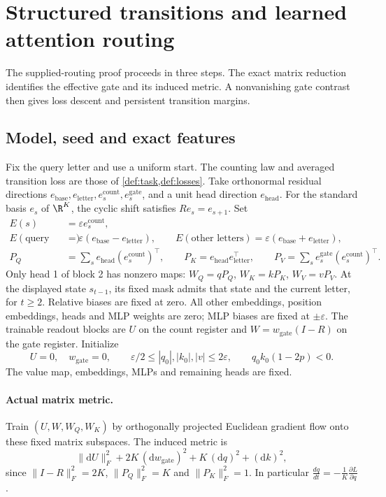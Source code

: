 \section{Structured transitions and learned attention routing}
\label{app:aligned-transformer}
The supplied-routing proof proceeds in three steps.
The exact matrix reduction identifies the effective gate and its induced metric.
A nonvanishing gate contrast then gives loss descent and persistent transition margins.


\subsection{Model, seed and exact features}
\label{app:aligned-seed}
Fix the query letter and use a uniform start. The counting law and averaged transition loss are those of \cref{def:task,def:losses}.
Take orthonormal residual directions $e_{\mathrm{base}},e_{\mathrm{letter}},e_s^{\mathrm{count}},
e_s^{\mathrm{gate}}$, and a unit head direction $e_{\mathrm{head}}$.
For the standard basis $e_s$ of $\R^K$, the cyclic shift satisfies $R e_s=e_{s+1}$. Set
\[
\begin{aligned}
 E(s)&=\varepsilon e_s^{\mathrm{count}},\\
 E(\text{query letter})&=\varepsilon(e_{\mathrm{base}}-e_{\mathrm{letter}}),\qquad
 E(\text{other letters})=\varepsilon(e_{\mathrm{base}}+e_{\mathrm{letter}}),\\
 P_Q&=\sum_s e_{\mathrm{head}}(e_s^{\mathrm{count}})^\top,\qquad
 P_K=e_{\mathrm{head}}e_{\mathrm{letter}}^\top,\qquad
 P_V=\sum_s e_s^{\mathrm{gate}}(e_s^{\mathrm{count}})^\top.
\end{aligned}
\]
Only head 1 of block 2 has nonzero maps:
$W_Q=qP_Q$, $W_K=kP_K$, $W_V=vP_V$. At the displayed state $s_{t-1}$,
its fixed mask admits that state and the current letter, for $t\ge2$.
Relative biases are fixed at zero.
All other embeddings, position embeddings, heads and MLP weights are zero;
MLP biases are fixed at $\pm\varepsilon$.
The trainable readout blocks are $U$ on the count register and
$W=w_{\mathrm{gate}}(I-R)$ on the gate register. Initialize
\[
 U=0,\quad w_{\mathrm{gate}}=0,\qquad
 \varepsilon/2\le |q_0|,|k_0|,|v|\le2\varepsilon,
 \qquad q_0k_0(1-2p)<0.
\]
The value map, embeddings, MLPs and remaining heads are fixed.

\paragraph{Actual matrix metric.}
Train $(U,W,W_Q,W_K)$ by orthogonally projected Euclidean gradient flow onto
these fixed matrix subspaces. The induced metric is
\begin{equation}
 \|\mathrm dU\|_F^2+2K\,(\mathrm dw_{\mathrm{gate}})^2+K\,(\mathrm dq)^2+(\mathrm dk)^2,
 \label{eq:aligned-metric}
\end{equation}
since $\|I-R\|_F^2=2K$, $\|P_Q\|_F^2=K$ and $\|P_K\|_F^2=1$.
In particular $\frac{dq}{dt}=-\frac1K\frac{\partial L}{\partial q}$.

